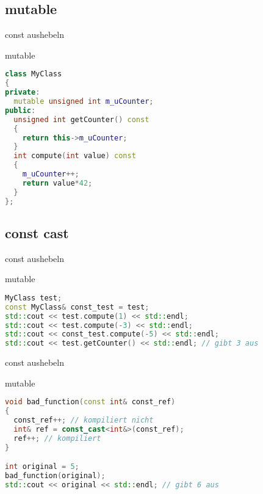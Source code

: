 
\subsection{mutable}

\begin{frame}[fragile]{const aushebeln}

\begin{block}{mutable}
\begin{small}
	\begin{lstlisting}[language=C++]
class MyClass
{
private:
  mutable unsigned int m_uCounter;
public:
  unsigned int getCounter() const
  {
    return this->m_uCounter;
  }
  int compute(int value) const
  {
    m_uCounter++;
    return value*42;
  }
};
	\end{lstlisting}
	\end{small}
\end{block}

\end{frame}

\subsection{const cast}

\begin{frame}[fragile]{const aushebeln}

\begin{block}{mutable}
\begin{small}
	\begin{lstlisting}[language=C++]
MyClass test;
const MyClass& const_test = test;
std::cout << test.compute(1) << std::endl;
std::cout << test.compute(-3) << std::endl;
std::cout << const_test.compute(-5) << std::endl;
std::cout << test.getCounter() << std::endl; // gibt 3 aus
	\end{lstlisting}
	\end{small}
\end{block}

\end{frame}

\begin{frame}[fragile]{const aushebeln}

\begin{block}{mutable}
\begin{small}
	\begin{lstlisting}[language=C++]
void bad_function(const int& const_ref)
{
  const_ref++; // kompiliert nicht
  int& ref = const_cast<int&>(const_ref);
  ref++; // kompiliert
}

int original = 5;
bad_function(original);
std::cout << original << std::endl; // gibt 6 aus
	\end{lstlisting}
	\end{small}
\end{block}

\end{frame}